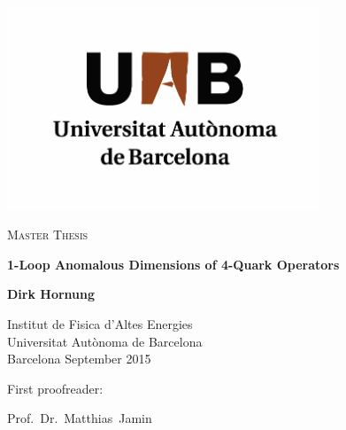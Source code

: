\begin{titlepage}
\HRule 

\vskip 2cm

\centering
\includegraphics[width=0.7\textwidth]{logo-uab.png}

\vskip 2cm

\begin{center}

\begin{LARGE}
	\textsc{Master Thesis}
\end{LARGE}\vskip 1.5cm

\begin{huge}
\textbf{1-Loop Anomalous Dimensions of 4-Quark Operators}
\end{huge}\vskip 2cm

\begin{LARGE}
	\textbf{Dirk Hornung}
\end{LARGE}\vskip 2.75cm

\begin{LARGE}
	Institut de Fisica d'Altes Energies\\
	Universitat Autònoma de Barcelona\\
	Barcelona \vskip 0.66cm
	September 2015
\end{LARGE}

\end{center}
\vfill

\begin{minipage}{5.5cm}
	\begin{flushright}
		\begin{large}
			First proofreader:\\
			
		\end{large}
	\end{flushright}
\end{minipage}\hskip 0.5cm
\begin{minipage}{6cm}
	\begin{flushleft}
		\begin{large}
			Prof.~Dr.~Matthias~Jamin\\
			

\end{large}
\end{flushleft}
\end{minipage}
\end{titlepage}
